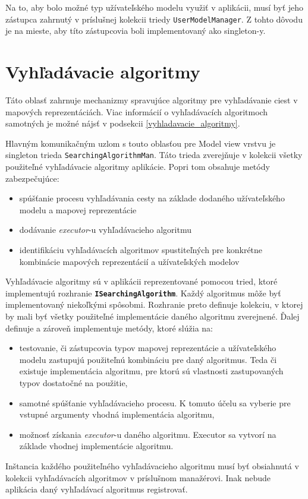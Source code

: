 Na to, aby bolo možné typ užívateľského modelu využiť v aplikácii, musí byť jeho zástupca zahrnutý v príslušnej kolekcii triedy \texttt{UserModelManager}. Z tohto dôvodu je na mieste, aby títo zástupcovia boli implementovaný ako singleton-y.

\section{Vyhľadávacie algoritmy}

Táto oblasť zahrnuje mechanizmy spravujúce algoritmy pre vyhľadávanie ciest v mapových reprezentáciách. Viac informácií o vyhľadávacích algoritmoch samotných je možné nájsť v podsekcii \ref{vyhladavacie_algoritmy}. 

Hlavným komunikačným uzlom s touto oblasťou pre Model view vrstvu je singleton trieda \texttt{SearchingAlgorithmMan}. Táto trieda zverejňuje v kolekcii všetky použiteľné vyhľadávacie algoritmy aplikácie. Popri tom obsahuje metódy zabezpečujúce: 
\begin{itemize}
    \item spúšťanie procesu vyhľadávania cesty na základe dodaného užívateľského modelu a mapovej reprezentácie
    \item dodávanie \textit{executor}-u vyhľadávacieho algoritmu
    \item identifikáciu vyhľadávacích algoritmov spustiteľných pre konkrétne kombinácie mapových reprezentácií a užívateľských modelov 
\end{itemize}

\bigskip

Vyhľadávacie algoritmy sú v aplikácii reprezentované pomocou tried, ktoré implementujú rozhranie \textbf{\texttt{ISearchingAlgorithm}}. Každý algoritmus môže byť implementovaný niekoľkými spôsobmi. Rozhranie preto definuje kolekciu, v ktorej by mali byť všetky použiteľné implementácie daného algoritmu zverejnené. Ďalej definuje a zároveň implementuje metódy, ktoré slúžia na:
\begin{itemize}
    \item testovanie, či zástupcovia typov mapovej reprezentácie a užívateľského modelu zastupujú použiteľnú kombináciu pre daný algoritmus. Teda či existuje implementácia algoritmu, pre ktorú sú vlastnosti zastupovaných typov dostatočné na použitie, 
    \item samotné spúšťanie vyhľadávacieho procesu. K tomuto účelu sa vyberie pre vstupné argumenty vhodná implementácia algoritmu,
    \item možnosť získania \textit{executor}-u daného algoritmu. Executor sa vytvorí na základe vhodnej implementácie algoritmu.
\end{itemize}
Inštancia každého použiteľného vyhľadávacieho algoritmu musí byť obsiahnutá v kolekcii vyhľadávacích algoritmov v príslušnom manažérovi. Inak nebude aplikácia daný vyhľadávací algoritmus registrovať. 

